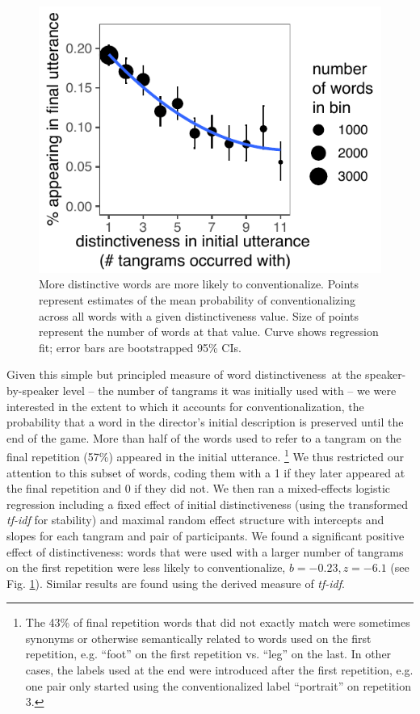 \documentclass[alpha-refs]{wiley-article}
\begin{document}
\begin{figure}[t!]
\centering
\includegraphics[scale=.9]{distinctiveness.pdf}
\caption{More distinctive words are more likely to conventionalize. Points represent estimates of the mean probability of conventionalizing across all words with a given distinctiveness value. Size of points represent the number of words at that value. Curve shows regression fit; error bars are bootstrapped 95\% CIs.}
\label{fig:distinct}
\end{figure}

Given this simple but principled measure of word distinctiveness at the speaker-by-speaker level -- the number of tangrams it was initially used with -- we were interested in the extent to which it accounts for conventionalization, the probability that a word in the director's initial description is preserved until the end of the game. 
More than half of the words used to refer to a tangram on the final repetition (57\%) appeared in the initial utterance. \footnote{The 43\% of final repetition words that did not exactly match were sometimes synonyms or otherwise semantically related to words used on the first repetition, e.g. ``foot'' on the first repetition vs. ``leg'' on the last. In other cases, the labels used at the end were introduced after the first repetition, e.g. one pair only started using the conventionalized label ``portrait'' on repetition 3.}
We thus restricted our attention to this subset of words, coding them with a 1 if they later appeared at the final repetition and 0 if they did not.
We then ran a mixed-effects logistic regression including a fixed effect of initial distinctiveness (using the transformed \emph{tf-idf} for stability) and maximal random effect structure with intercepts and slopes for each tangram and pair of participants.
We found a significant positive effect of distinctiveness: words that were used with a larger number of tangrams on the first repetition were less likely to conventionalize, $b = -0.23, z = -6.1$ (see Fig. \ref{fig:distinct}). 
Similar results are found using the derived measure of \emph{tf-idf}.
\end{document}
